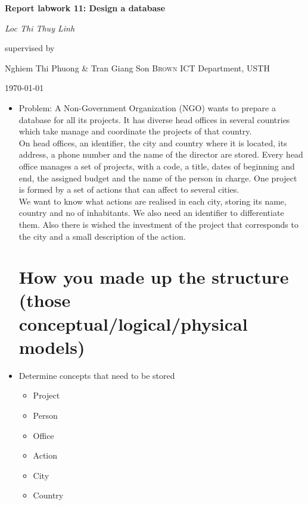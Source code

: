 \documentclass[13pt,a4paper]{report}
\begin{document}
\begin{titlepage}
	\centering
	\vspace{2cm}
	{\huge\bfseries Report labwork 11: Design a database \par}
	\vspace{2cm}
	{\Large\itshape Loc Thi Thuy Linh\par}
	\vfill
	supervised by\par
	Nghiem Thi Phuong \& Tran Giang Son \textsc{Brown}
	ICT Department, USTH\par
	\vfill
	{\large \today\par}
\end{titlepage}

\begin{itemize}

\item Problem:
\indent A Non-Government Organization (NGO) wants to prepare a database for
all its projects. It has diverse head offices in several countries which take
manage and coordinate the projects of that country.
\\
\indent On head offices, an identifier, the city and country where it is located, its
address, a phone number and the name of the director are stored. Every
head office manages a set of projects, with a code, a title, dates of beginning
and end, the assigned budget and the name of the person in charge. One
project is formed by a set of actions that can affect to several cities.
\\
\indent We want to know what actions are realised in each city, storing its name,
country and no of inhabitants. We also need an identifier to differentiate
them. Also there is wished the investment of the project that corresponds to
the city and a small description of the action.


\section{ How you made up the structure (those conceptual/logical/physical models) }

\item Determine concepts that need to be stored
	\begin{itemize}
	\item Project
	\item Person
	\item Office
	\item Action
	\item City
	\item Country
	\end{itemize}


\end{itemize}
\end{document}
